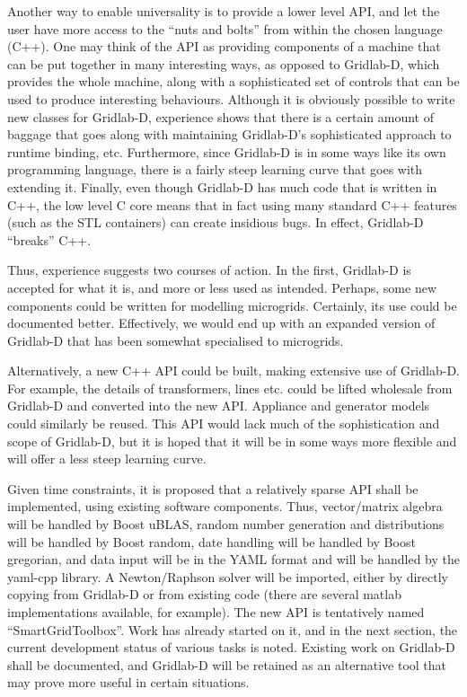 \documentclass[12pt]{article}
\begin{document}
Another way to enable universality is to provide a lower level API, and let the user have more access to the ``nuts and bolts'' from within the chosen language (C++). One may think of the API as providing components of a machine that can be put together in many interesting ways, as opposed to Gridlab-D, which provides the whole machine, along with a sophisticated set of controls that can be used to produce interesting behaviours. Although it is obviously possible to write new classes for Gridlab-D, experience shows that there is a certain amount of baggage that goes along with maintaining Gridlab-D's sophisticated approach to runtime binding, etc. Furthermore, since Gridlab-D is in some ways like its own programming language, there is a fairly steep learning curve that goes with extending it. Finally, even though Gridlab-D has much code that is written in C++, the low level C core means that in fact using many standard C++ features (such as the STL containers) can create insidious bugs. In effect, Gridlab-D ``breaks'' C++.

Thus, experience suggests two courses of action. In the first, Gridlab-D is accepted for what it is, and more or less used as intended. Perhaps, some new components could be written for modelling microgrids. Certainly, its use could be documented better. Effectively, we would end up with an expanded version of Gridlab-D that has been somewhat specialised to microgrids.

Alternatively, a new C++ API could be built, making extensive use of Gridlab-D. For example, the details of transformers, lines etc. could be lifted wholesale from Gridlab-D and converted into the new API. Appliance and generator models could similarly be reused. This API would lack much of the sophistication and scope of Gridlab-D, but it is hoped that it will be in some ways more flexible and will offer a less steep learning curve.

Given time constraints, it is proposed that a relatively sparse API shall be implemented, using existing software components. Thus, vector/matrix algebra will be handled by Boost uBLAS, random number generation and distributions will be handled by Boost random, date handling will be handled by Boost gregorian, and data input will be in the YAML format and will be handled by the yaml-cpp library.  A Newton/Raphson solver will be imported, either by directly copying from Gridlab-D or from existing code (there are several matlab implementations available, for example). The new API is tentatively named ``SmartGridToolbox''. Work has already started on it, and in the next section, the current development status of various tasks is noted. Existing work on Gridlab-D shall be documented, and Gridlab-D will be retained as an alternative tool that may prove more useful in certain situations.
\end{document}
